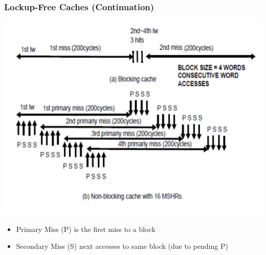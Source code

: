 \documentclass{beamer}
\begin{document}
\begin{frame}[fragile,t]
\frametitle{Lockup-Free Caches (Continuation)}


\includegraphics[width=44ex]{Figures/FigsMemH/PrimSecMiss}

\begin{itemize}
    \item Primary Miss (P) is the first miss to a block
    \item Secondary Miss (S) next accesses to same block {\scriptsize (due to pending P)} 
        \begin{itemize}
        \end  {itemize}
\end  {itemize}
\end{frame}
\end{document}
